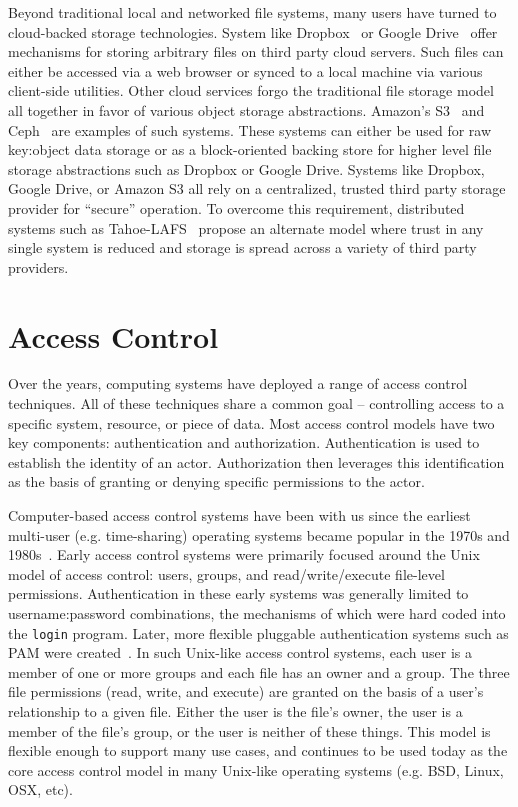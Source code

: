 Beyond traditional local and networked file systems, many users have
turned to cloud-backed storage technologies. System like
Dropbox~\cite{dropbox} or Google Drive~\cite{google-drive} offer
mechanisms for storing arbitrary files on third party cloud
servers. Such files can either be accessed via a web browser or synced
to a local machine via various client-side utilities. Other cloud
services forgo the traditional file storage model all together in
favor of various object storage abstractions. Amazon's
S3~\cite{amazon-s3} and Ceph~\cite{ceph} are examples of such
systems. These systems can either be used for raw key:object data
storage or as a block-oriented backing store for higher level file
storage abstractions such as Dropbox or Google Drive. Systems like
Dropbox, Google Drive, or Amazon S3 all rely on a centralized, trusted
third party storage provider for ``secure'' operation. To overcome
this requirement, distributed systems such as
Tahoe-LAFS~\cite{wilcox-o'hearn2008} propose an alternate model where
trust in any single system is reduced and storage is spread across a
variety of third party providers.

\section{Access Control}
\label{chap:background:ac}

Over the years, computing systems have deployed a range of access
control techniques. All of these techniques share a common goal --
controlling access to a specific system, resource, or piece of
data. Most access control models have two key components:
authentication and authorization.  Authentication is used to establish
the identity of an actor. Authorization then leverages this
identification as the basis of granting or denying specific
permissions to the actor.

Computer-based access control systems have been with us since the
earliest multi-user (e.g. time-sharing) operating systems became
popular in the 1970s and 1980s~\cite{saltzer1974}. Early access
control systems were primarily focused around the Unix model of access
control: users, groups, and read/write/execute file-level
permissions. Authentication in these early systems was generally
limited to username:password combinations, the mechanisms of which
were hard coded into the \texttt{login} program. Later, more flexible
pluggable authentication systems such as PAM were
created~\cite{samar1996, linux-pam, openpam}. In such Unix-like access
control systems, each user is a member of one or more groups and each
file has an owner and a group. The three file permissions (read,
write, and execute) are granted on the basis of a user's relationship
to a given file. Either the user is the file's owner, the user is a
member of the file's group, or the user is neither of these
things. This model is flexible enough to support many use cases, and
continues to be used today as the core access control model in many
Unix-like operating systems (e.g. BSD, Linux, OSX, etc).

